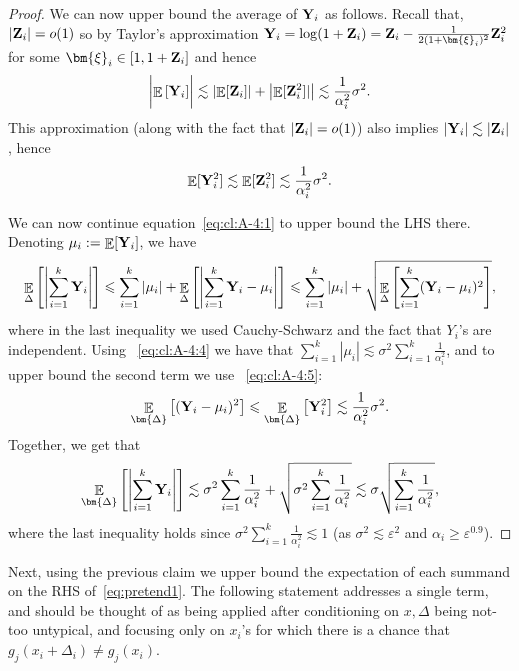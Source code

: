\documentclass[10pt,a4paper]{article}
\newcommand\E{\mathop{\mathbb{E}}}
\newcommand\card[1]{\left| {#1} \right|}
\newcommand\Expect[2]{{\mathop{\mathbb{E}}_{#1}\left[ {#2} \right]}}
\newcommand\eps{\varepsilon}
\renewcommand\geq{\geqslant}
\renewcommand\leq{\leqslant}
\renewcommand\le{\leqslant}
\newcommand{\De}{\Delta}
\def\ll{\lesssim}
\begin{document}
\begin{proof}
     We can now upper bound the average of ${\bf Y}_i$ as follows. Recall that, $\card{{\bf Z}_i} = o(1)$ so by Taylor's approximation
     ${\bf Y}_i = \log(1+{\bf Z}_i) = {\bf Z}_i - \frac{1}{2(1+\bm{\xi}_i)^2} {\bf Z}_i^2$ for some $\bm{\xi}_i\in [1,1+{\bf Z}_i]$ and hence
	  \begin{equation}
	 \card{\Expect{}{{\bf Y}_i}} \ll \card{\E[{\bf Z}_i]} + \card{\E[{\bf Z}_i^2]|} \ll \frac{1}{\alpha_i^2}\sigma^2.
	 \label{eq:cl:A-4:4}
	 \end{equation}
	 This approximation (along with the fact that $\card{{\bf Z}_i} = o(1)$) also implies $\card{{\bf Y}_i}\ll \card{{\bf Z}_i}$, hence
	 \begin{equation}
	 \E[{\bf Y}_i^2] \ll \E[{\bf Z}_i^2]  \ll \frac{1}{\alpha_i^2}\sigma^2.
	 \label{eq:cl:A-4:5}
	 \end{equation}
	
	 We can now continue equation~\eqref{eq:cl:A-4:1} to upper bound the LHS there.
     Denoting $\mu_i:=\E[{\bf Y}_i]$, we have
	 \begin{align*}
	 \Expect{\De}{\card{\sum_{i=1}^k {\bf Y}_i}}
     \leq \sum_{i=1}^k |\mu_i|  +  \Expect{\De}{\card{\sum_{i=1}^k {\bf Y}_i-\mu_i}}
     \le \sum_{i=1}^k |\mu_i|
	 + \sqrt{\Expect{\De}{\sum_{i=1}^k ({\bf Y}_i-\mu_i)^2}},
	 \end{align*}
     where in the last inequality we used Cauchy-Schwarz and the fact that $Y_i$'s are independent.
     Using ~\eqref{eq:cl:A-4:4} we have that $\sum_{i=1}^k |\mu_i|\ll \sigma^2\sum_{i=1}^k \frac{1}{\alpha_i^2}$,
     and to upper bound the second term we use ~\eqref{eq:cl:A-4:5}:
     \[
     \Expect{\bm{\De}}{({\bf Y}_i-\mu_i)^2}
     \leq \Expect{\bm{\De}}{{\bf Y}_i^2}
     \ll \frac{1}{\alpha_i^2}\sigma^2.
     \]
     Together, we get that
     \[
     \Expect{\bm{\De}}{\card{\sum_{i=1}^k {\bf Y}_i}}
     \ll \sigma^2\sum_{i=1}^k \frac{1}{\alpha_i^2} + \sqrt{\sigma^2\sum_{i=1}^k \frac{1}{\alpha_i^2}}
     \ll \sigma  \sqrt{\sum_{i=1}^k \frac{1}{\alpha_i^2}},
     \]
     where the last inequality holds since
     $\sigma^2\sum_{i=1}^k \frac{1}{\alpha_i^2}\ll 1$
     (as $\sigma^2\ll \eps^2$ and $\alpha_i\geq \eps^{0.9}$).
\end{proof}


Next, using the previous claim we upper bound the expectation of each summand on the RHS of~\eqref{eq:pretend1}.
The following statement addresses a single term, and should be thought of as being applied after conditioning on
$x,\De$ being not-too untypical, and focusing only on $x_i$'s for which there is a chance that
$g_j(x_i + \De_i)\neq g_j(x_i)$.
\end{document}
